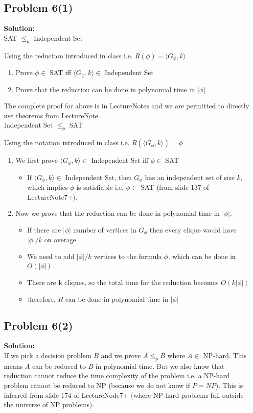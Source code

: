\documentclass[12pt,a4paper]{article}
\newcommand{\solution}{\noindent\textbf{Solution:}\\\indent}
\begin{document}
\newpage
\subsection*{Problem 6(1)}
\solution
SAT $\leq_p$ Independent Set

Using the reduction introduced in class i.e. $R(\phi) = \langle G_{\phi}, k\rangle$
\begin{enumerate}
    \item Prove $\phi \in$ SAT iff $\langle G_{\phi}, k\rangle \in$ Independent Set
    \item Prove that the reduction can be done in polynomial time in $|\phi|$ 
\end{enumerate}
The complete proof for above is in LectureNotes and we are permitted to directly use theorems from LectureNote. \\

Independent Set $\leq_p$ SAT

Using the notation introduced in class i.e. $R(\langle G_{\phi},k\rangle) = \phi$
\begin{enumerate}
    \item We first prove $\langle G_{\phi},k\rangle \in$ Independent Set iff $\phi \in$ SAT
    \begin{itemize}
        \item If $\langle G_{\phi},k\rangle \in$ Independent Set, then $G_{\phi}$ has an independent set of size $k$, which implies $\phi$ is satisfiable i.e. $\phi \in$ SAT (from slide 137 of LectureNote7+).
    \end{itemize}
    \item Now we prove that the reduction can be done in polynomial time in $|\phi|$.
    \begin{itemize}
        \item If there are $|\phi|$ number of vertices in $G_{\phi}$ then every clique would have $|\phi|/k$ on average
        \item We need to add $|\phi|/k$ vertices to the formula $\phi$, which can be done in $O(|\phi|)$.
        \item There are k cliques, so the total time for the reduction becomes $O(k|\phi|)$
        \item therefore, $R$ can be done in polynomial time in $|\phi|$
    \end{itemize}
\end{enumerate}

\subsection*{Problem 6(2)}
\solution
If we pick a decision problem $B$ and we prove $A \leq_p B$ where $A \in$ NP-hard. This means $A$ can be reduced to $B$ in polynomial time. But we also know that reduction cannot reduce the time complexity of the problem i.e. a NP-hard problem cannot be reduced to NP (because we do not know if $P = NP$). This is inferred from slide 174 of LectureNode7+ (where NP-hard problems fall outside the universe of NP problems).
\end{document}
